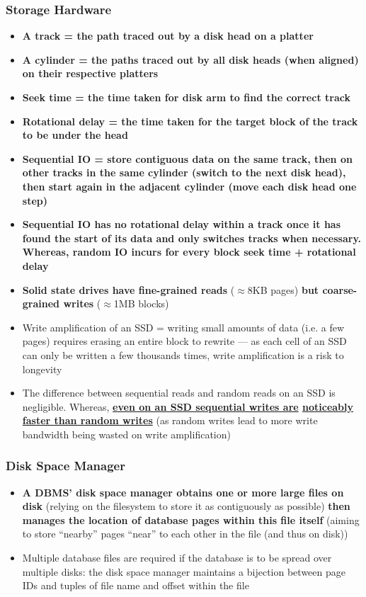 \documentclass[20pt,a4paper,landscape]{extarticle}
\begin{document}
\begin{flushleft}
\subsubsection{Storage Hardware}
\begin{itemize}
\item \textbf{A track = the path traced out by a disk head on a platter}
\item \textbf{A cylinder = the paths traced out by all disk heads (when aligned) on their respective platters}
\item \textbf{Seek time = the time taken for disk arm to find the correct track}
\item \textbf{Rotational delay = the time taken for the target block of the track to be under the head}
\clearpage
\item \textbf{Sequential IO = store contiguous data on the same track, then on other tracks in the same cylinder (switch to the next disk head), then start again in the adjacent cylinder (move each disk head one step)}
\item \textbf{Sequential IO has no rotational delay within a track once it has found the start of its data and only switches tracks when necessary. Whereas, random IO incurs for every block seek time + rotational delay}
\item \textbf{Solid state drives have fine-grained reads} ($\approx$8KB pages) \textbf{but coarse-grained writes} ($\approx$1MB blocks)
\item Write amplification of an SSD = writing small amounts of data (i.e. a few pages) requires erasing an entire block to rewrite --- as each cell of an SSD can only be written a few thousands times, write amplification is a risk to longevity
\item The difference between sequential reads and random reads on an SSD is negligible. Whereas, \textbf{\underline{even on an SSD sequential writes are} \underline{noticeably faster than random writes}} (as random writes lead to more write bandwidth being wasted on write amplification)
\end{itemize}
\subsubsection{Disk Space Manager}
\begin{itemize}
\item \textbf{A DBMS' disk space manager obtains one or more large files on disk} (relying on the filesystem to store it as contiguously as possible) \textbf{then manages the location of database pages within this file itself} (aiming to store ``nearby'' pages ``near'' to each other in the file (and thus on disk))
\item Multiple database files are required if the database is to be spread over multiple disks: the disk space manager maintains a bijection between page IDs and tuples of file name and offset within the file
\end{itemize}

\end{flushleft}
\end{document}
